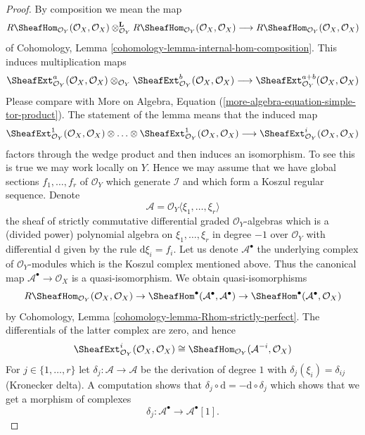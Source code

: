 \begin{proof}
By composition we mean the map
$$
R\SheafHom_{\mathcal{O}_Y}(\mathcal{O}_X, \mathcal{O}_X)
\otimes_{\mathcal{O}_Y}^\mathbf{L}
R\SheafHom_{\mathcal{O}_Y}(\mathcal{O}_X, \mathcal{O}_X)
\longrightarrow
R\SheafHom_{\mathcal{O}_Y}(\mathcal{O}_X, \mathcal{O}_X)
$$
of Cohomology, Lemma \ref{cohomology-lemma-internal-hom-composition}.
This induces multiplication maps
$$
\SheafExt^a_{\mathcal{O}_Y}(\mathcal{O}_X, \mathcal{O}_X)
\otimes_{\mathcal{O}_Y}
\SheafExt^b_{\mathcal{O}_Y}(\mathcal{O}_X, \mathcal{O}_X)
\longrightarrow
\SheafExt^{a + b}_{\mathcal{O}_Y}(\mathcal{O}_X, \mathcal{O}_X)
$$
Please compare with
More on Algebra, Equation (\ref{more-algebra-equation-simple-tor-product}).
The statement of the lemma means that the induced map
$$
\SheafExt^1_{\mathcal{O}_Y}(\mathcal{O}_X, \mathcal{O}_X)
\otimes \ldots \otimes
\SheafExt^1_{\mathcal{O}_Y}(\mathcal{O}_X, \mathcal{O}_X)
\longrightarrow
\SheafExt^i_{\mathcal{O}_Y}(\mathcal{O}_X, \mathcal{O}_X)
$$
factors through the wedge product and then induces an isomorphism.
To see this is true we may work locally on $Y$. Hence we may assume
that we have global sections $f_1, \ldots, f_r$ of $\mathcal{O}_Y$
which generate $\mathcal{I}$ and which form a Koszul regular sequence.
Denote
$$
\mathcal{A} = \mathcal{O}_Y\langle \xi_1, \ldots, \xi_r\rangle
$$
the sheaf of strictly commutative differential graded $\mathcal{O}_Y$-algebras
which is a (divided power) polynomial algebra on
$\xi_1, \ldots, \xi_r$ in degree $-1$ over $\mathcal{O}_Y$
with differential $\text{d}$ given by the rule $\text{d}\xi_i = f_i$.
Let us denote $\mathcal{A}^\bullet$ the underlying
complex of $\mathcal{O}_Y$-modules which is the Koszul complex
mentioned above. Thus the canonical map
$\mathcal{A}^\bullet \to \mathcal{O}_X$
is a quasi-isomorphism. We obtain quasi-isomorphisms
$$
R\SheafHom_{\mathcal{O}_Y}(\mathcal{O}_X, \mathcal{O}_X) \to
\SheafHom^\bullet(\mathcal{A}^\bullet, \mathcal{A}^\bullet) \to
\SheafHom^\bullet(\mathcal{A}^\bullet, \mathcal{O}_X)
$$
by Cohomology, Lemma \ref{cohomology-lemma-Rhom-strictly-perfect}.
The differentials of the latter complex are zero, and hence
$$
\SheafExt^i_{\mathcal{O}_Y}(\mathcal{O}_X, \mathcal{O}_X)
\cong \SheafHom_{\mathcal{O}_Y}(\mathcal{A}^{-i}, \mathcal{O}_X)
$$
For $j \in \{1, \ldots, r\}$ let $\delta_j : \mathcal{A} \to \mathcal{A}$
be the derivation of degree $1$ with $\delta_j(\xi_i) = \delta_{ij}$
(Kronecker delta). A computation shows that
$\delta_j \circ \text{d} = - \text{d} \circ \delta_j$ which shows that
we get a morphism of complexes
$$
\delta_j : \mathcal{A}^\bullet \to \mathcal{A}^\bullet[1].
$$
\end{proof}
